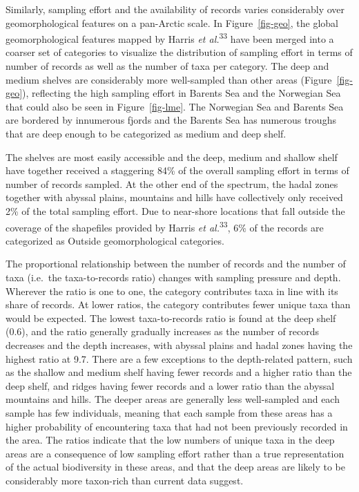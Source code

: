 \documentclass[
  letterpaper,
  DIV=11,
  numbers=noendperiod]{scrartcl}
\begin{document}
Similarly, sampling effort and the availability of records varies
considerably over geomorphological features on a pan-Arctic scale. In
Figure~\ref{fig-geo}, the global geomorphological features mapped by
Harris \emph{et al.}\textsuperscript{33} have been merged into a coarser
set of categories to visualize the distribution of sampling effort in
terms of number of records as well as the number of taxa per category.
The deep and medium shelves are considerably more well-sampled than
other areas (Figure~\ref{fig-geo}), reflecting the high sampling effort
in Barents Sea and the Norwegian Sea that could also be seen in
Figure~\ref{fig-lme}. The Norwegian Sea and Barents Sea are bordered by
innumerous fjords and the Barents Sea has numerous troughs that are deep
enough to be categorized as medium and deep shelf.

The shelves are most easily accessible and the deep, medium and shallow
shelf have together received a staggering 84\% of the overall sampling
effort in terms of number of records sampled. At the other end of the
spectrum, the hadal zones together with abyssal plains, mountains and
hills have collectively only received 2\% of the total sampling effort.
Due to near-shore locations that fall outside the coverage of the
shapefiles provided by Harris \emph{et al.}\textsuperscript{33}, 6\% of
the records are categorized as Outside geomorphological categories.

The proportional relationship between the number of records and the
number of taxa (i.e.~the taxa-to-records ratio) changes with sampling
pressure and depth. Wherever the ratio is one to one, the category
contributes taxa in line with its share of records. At lower ratios, the
category contributes fewer unique taxa than would be expected. The
lowest taxa-to-records ratio is found at the deep shelf (0.6), and the
ratio generally gradually increases as the number of records decreases
and the depth increases, with abyssal plains and hadal zones having the
highest ratio at 9.7. There are a few exceptions to the depth-related
pattern, such as the shallow and medium shelf having fewer records and a
higher ratio than the deep shelf, and ridges having fewer records and a
lower ratio than the abyssal mountains and hills. The deeper areas are
generally less well-sampled and each sample has few individuals, meaning
that each sample from these areas has a higher probability of
encountering taxa that had not been previously recorded in the area. The
ratios indicate that the low numbers of unique taxa in the deep areas
are a consequence of low sampling effort rather than a true
representation of the actual biodiversity in these areas, and that the
deep areas are likely to be considerably more taxon-rich than current
data suggest.
\end{document}
